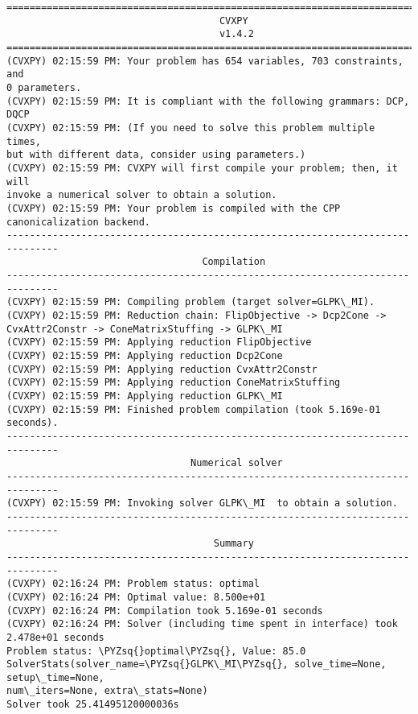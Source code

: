 \begin{Verbatim}[commandchars=\\\{\}]
===============================================================================
                                     CVXPY
                                     v1.4.2
===============================================================================
(CVXPY) 02:15:59 PM: Your problem has 654 variables, 703 constraints, and
0 parameters.
(CVXPY) 02:15:59 PM: It is compliant with the following grammars: DCP,
DQCP
(CVXPY) 02:15:59 PM: (If you need to solve this problem multiple times,
but with different data, consider using parameters.)
(CVXPY) 02:15:59 PM: CVXPY will first compile your problem; then, it will
invoke a numerical solver to obtain a solution.
(CVXPY) 02:15:59 PM: Your problem is compiled with the CPP
canonicalization backend.
-------------------------------------------------------------------------------
                                  Compilation
-------------------------------------------------------------------------------
(CVXPY) 02:15:59 PM: Compiling problem (target solver=GLPK\_MI).
(CVXPY) 02:15:59 PM: Reduction chain: FlipObjective -> Dcp2Cone ->
CvxAttr2Constr -> ConeMatrixStuffing -> GLPK\_MI
(CVXPY) 02:15:59 PM: Applying reduction FlipObjective
(CVXPY) 02:15:59 PM: Applying reduction Dcp2Cone
(CVXPY) 02:15:59 PM: Applying reduction CvxAttr2Constr
(CVXPY) 02:15:59 PM: Applying reduction ConeMatrixStuffing
(CVXPY) 02:15:59 PM: Applying reduction GLPK\_MI
(CVXPY) 02:15:59 PM: Finished problem compilation (took 5.169e-01 seconds).
-------------------------------------------------------------------------------
                                Numerical solver
-------------------------------------------------------------------------------
(CVXPY) 02:15:59 PM: Invoking solver GLPK\_MI  to obtain a solution.
-------------------------------------------------------------------------------
                                    Summary
-------------------------------------------------------------------------------
(CVXPY) 02:16:24 PM: Problem status: optimal
(CVXPY) 02:16:24 PM: Optimal value: 8.500e+01
(CVXPY) 02:16:24 PM: Compilation took 5.169e-01 seconds
(CVXPY) 02:16:24 PM: Solver (including time spent in interface) took 2.478e+01 seconds
Problem status: \PYZsq{}optimal\PYZsq{}, Value: 85.0
SolverStats(solver_name=\PYZsq{}GLPK\_MI\PYZsq{}, solve_time=None, setup\_time=None,
num\_iters=None, extra\_stats=None)
Solver took 25.41495120000036s
\end{Verbatim}

